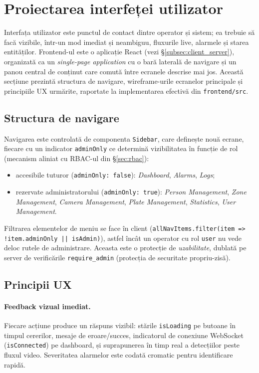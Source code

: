 \documentclass[../../main.tex]{subfiles}
\begin{document}
\section{Proiectarea interfeței utilizator}
\label{sec:interfata_utilizator}

Interfața utilizator este punctul de contact dintre operator și sistem; ea trebuie să facă vizibile, într-un mod imediat și neambiguu, fluxurile live, alarmele și starea entităților. Frontend-ul este o aplicație React (vezi \S\ref{subsec:client_server}), organizată ca un \emph{single-page application} cu o bară laterală de navigare și un panou central de conținut care comută între ecranele descrise mai jos. Această secțiune prezintă structura de navigare, wireframe-urile ecranelor principale și principiile UX urmărite, raportate la implementarea efectivă din \texttt{frontend/src}.


\subsection{Structura de navigare}

Navigarea este controlată de componenta \texttt{Sidebar}, care definește nouă ecrane, fiecare cu un indicator \texttt{adminOnly} ce determină vizibilitatea în funcție de rol (mecanism aliniat cu RBAC-ul din \S\ref{sec:rbac}):
\begin{itemize}
    \item accesibile tuturor (\texttt{adminOnly: false}): \emph{Dashboard}, \emph{Alarms}, \emph{Logs};
    \item rezervate administratorului (\texttt{adminOnly: true}): \emph{Person Management}, \emph{Zone Management}, \emph{Camera Management}, \emph{Plate Management}, \emph{Statistics}, \emph{User Management}.
\end{itemize}
Filtrarea elementelor de meniu se face în client (\texttt{allNavItems.filter(item => !item.adminOnly || isAdmin)}), astfel încât un operator cu rol \texttt{user} nu vede deloc rutele de administrare. Aceasta este o protecție de \emph{uzabilitate}, dublată pe server de verificările \texttt{require\_admin} (protecția de securitate propriu-zisă).


\subsection{Principii UX}

\paragraph*{Feedback vizual imediat.} Fiecare acțiune produce un răspuns vizibil: stările \texttt{isLoading} pe butoane în timpul cererilor, mesaje de eroare/succes, indicatorul de conexiune WebSocket (\texttt{isConnected}) pe dashboard, și suprapunerea în timp real a detecțiilor peste fluxul video. Severitatea alarmelor este codată cromatic pentru identificare rapidă.
\end{document}
